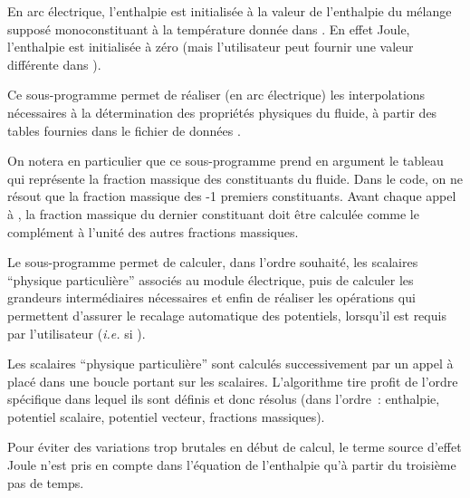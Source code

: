 En arc \'electrique, l'enthalpie est initialis\'ee \`a la valeur de l'enthalpie du m\'elange
suppos\'e monoconstituant \`a la temp\'erature  donn\'ee
dans .  En effet Joule, l'enthalpie est initialis\'ee \`a z\'ero
(mais l'utilisateur peut fournir une valeur diff\'erente dans ).


Ce sous-programme permet de r\'ealiser (en arc \'electrique) les interpolations
n\'ecessaires \`a la d\'e\-ter\-mi\-na\-tion des propri\'et\'es physiques du fluide, \`a
partir des tables fournies dans le fichier de donn\'ees .

On notera en particulier que ce sous-programme prend en argument le tableau
 qui repr\'esente la fraction massique des 
constituants du fluide. Dans le code, on ne r\'esout que la fraction massique
des -1 premiers constituants. Avant chaque appel \`a ,
la fraction massique du dernier constituant doit \^etre calcul\'ee comme le
compl\'ement \`a l'unit\'e des autres fractions massiques.


Le sous-programme  permet de calculer, dans l'ordre souhait\'e,
les  scalaires ``physique particuli\`ere'' associ\'es au module
\'electrique, puis de calculer les grandeurs interm\'ediaires n\'e\-ces\-sai\-res et
enfin de
r\'ealiser les op\'erations qui permettent d'assurer le recalage automatique
des potentiels, lorsqu'il est requis par l'utilisateur ({\it i.e.} si ).

Les  scalaires ``physique particuli\`ere'' sont calcul\'es successivement par un
appel \`a  plac\'e dans une boucle portant sur les 
scalaires. L'algorithme tire profit de l'ordre sp\'ecifique dans lequel ils sont d\'efinis et donc
r\'esolus (dans l'ordre~: enthalpie, potentiel scalaire, potentiel vecteur, fractions massiques).

Pour \'eviter des variations trop brutales en d\'ebut de calcul, le terme source
d'effet Joule n'est pris en compte dans l'\'equation de l'enthalpie qu'\`a
partir du troisi\`eme pas de temps.

